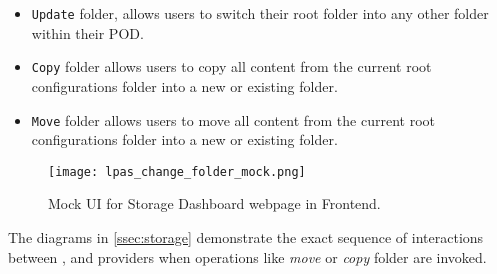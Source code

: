\begin{itemize}
    \item \texttt{Update} folder, allows users to switch their root folder into any other folder within their POD.
    \item \texttt{Copy} folder allows users to copy all content from the current root configurations folder into a new or existing folder.
    \item \texttt{Move} folder allows users to move all content from the current root configurations folder into a new or existing folder.
\end{itemize}


\begin{figure}[h]
\centering
\texttt{[image: lpas\_change\_folder\_mock.png]}
\caption{Mock UI for Storage Dashboard webpage in \lpa{} Frontend.}
\label{fig:lpas_change_folder_mock}
\end{figure}

The diagrams in \autoref{ssec:storage} demonstrate the exact sequence of interactions between \lpa{}, \lpas{} and \solid{} providers when operations like \textit{move} or \textit{copy} folder are invoked.


